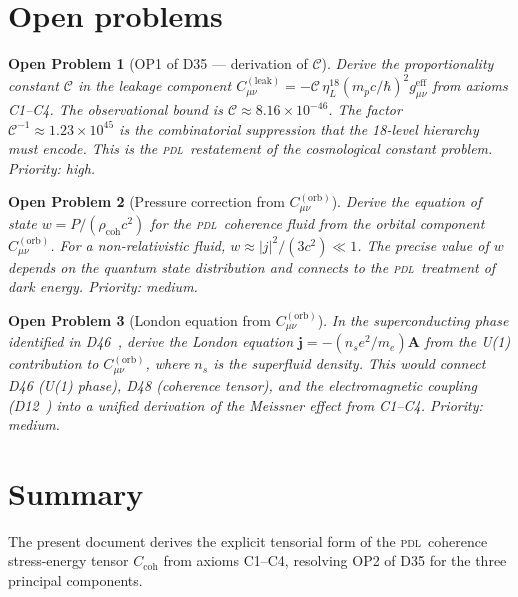 \documentclass[12pt,a4paper]{article}
\newtheorem{openproblem}{Open Problem}
\newcommand{\hb}{\hbar}
\newcommand{\PDL}{\textsc{pdl}}
\newcommand{\Ccoh}{C_{\mathrm{coh}}}
\newcommand{\Corb}{C^{(\mathrm{orb})}}
\newcommand{\Cleak}{C^{(\mathrm{leak})}}
\newcommand{\rhocoh}{\rho_{\mathrm{coh}}}
\newcommand{\geff}{g_{\mu\nu}^{\mathrm{eff}}}
\newcommand{\etaL}{\eta_L}
\begin{document}
\section{Open problems}
\label{sec:open}

\begin{openproblem}[OP1 of D35 --- derivation of $\mathcal{C}$]
\label{op:C}
Derive the proportionality constant $\mathcal{C}$ in the leakage component $\Cleak_{\mu\nu} = -\mathcal{C}\,\etaL^{18}(m_p c/\hb)^2\geff$ from axioms C1--C4. The observational bound is $\mathcal{C} \approx 8.16\times10^{-46}$. The factor $\mathcal{C}^{-1} \approx 1.23\times10^{45}$ is the combinatorial suppression that the 18-level hierarchy must encode. This is the \PDL\ restatement of the cosmological constant problem. Priority: high.
\end{openproblem}

\begin{openproblem}[Pressure correction from $\Corb_{\mu\nu}$]
\label{op:pressure}
Derive the equation of state $w = P/(\rhocoh c^2)$ for the \PDL\ coherence fluid from the orbital component $\Corb_{\mu\nu}$. For a non-relativistic fluid, $w \approx |j|^2/(3c^2) \ll 1$. The precise value of $w$ depends on the quantum state distribution and connects to the \PDL\ treatment of dark energy. Priority: medium.
\end{openproblem}

\begin{openproblem}[London equation from $\Corb_{\mu\nu}$]
\label{op:London}
In the superconducting phase identified in D46~\cite{PDL_D46_2026}, derive the London equation $\mathbf{j} = -(n_s e^2/m_e)\mathbf{A}$ from the U(1) contribution to $\Corb_{\mu\nu}$, where $n_s$ is the superfluid density. This would connect D46 (U(1) phase), D48 (coherence tensor), and the electromagnetic coupling (D12~\cite{PDL_D12_2026}) into a unified derivation of the Meissner effect from C1--C4. Priority: medium.
\end{openproblem}

\section{Summary}
\label{sec:summary}

The present document derives the explicit tensorial form of the \PDL\ coherence stress-energy tensor $\Ccoh$ from axioms C1--C4, resolving OP2 of D35 for the three principal components.
\end{document}
